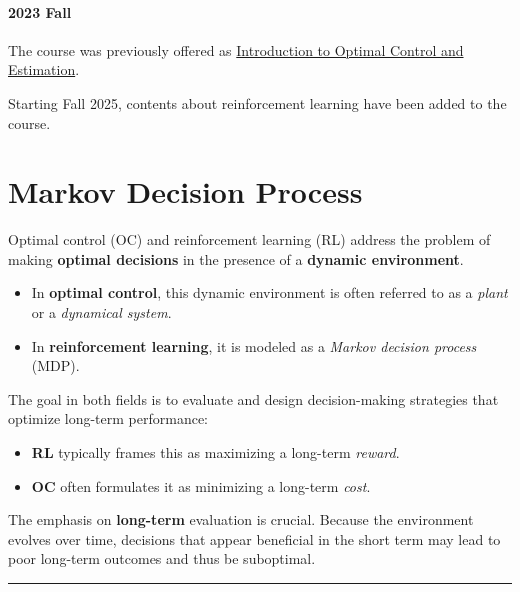 \documentclass[
]{book}
\providecommand{\tightlist}{%
  \setlength{\itemsep}{0pt}\setlength{\parskip}{0pt}}
\theoremstyle{definition}
\theoremstyle{definition}
\theoremstyle{definition}
\theoremstyle{definition}
\theoremstyle{remark}
\begin{document}
\subsubsection*{2023 Fall}\label{fall-1}

The course was previously offered as \href{https://hankyang.seas.harvard.edu/OptimalControlEstimation/}{Introduction to Optimal Control and Estimation}.

Starting Fall 2025, contents about reinforcement learning have been added to the course.

\chapter{Markov Decision Process}\label{mdp}

Optimal control (OC) and reinforcement learning (RL) address the problem of making \textbf{optimal decisions} in the presence of a \textbf{dynamic environment}.

\begin{itemize}
\tightlist
\item
  In \textbf{optimal control}, this dynamic environment is often referred to as a \emph{plant} or a \emph{dynamical system}.\\
\item
  In \textbf{reinforcement learning}, it is modeled as a \emph{Markov decision process} (MDP).
\end{itemize}

The goal in both fields is to evaluate and design decision-making strategies that optimize long-term performance:

\begin{itemize}
\tightlist
\item
  \textbf{RL} typically frames this as maximizing a long-term \emph{reward}.\\
\item
  \textbf{OC} often formulates it as minimizing a long-term \emph{cost}.
\end{itemize}

The emphasis on \textbf{long-term} evaluation is crucial. Because the environment evolves over time, decisions that appear beneficial in the short term may lead to poor long-term outcomes and thus be suboptimal.

\begin{center}\rule{0.5\linewidth}{0.5pt}\end{center}
\end{document}
